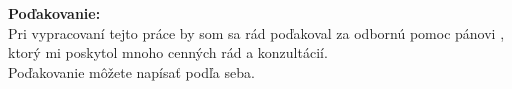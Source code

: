 \begin{flushleft}
    \textbf{Poďakovanie:}\\
    \vspace{1em}
Pri vypracovaní tejto práce by som sa rád poďakoval za odbornú pomoc pánovi \supervisor, ktorý mi poskytol mnoho cenných rád a konzultácií.
\vspace{1em}\\
Poďakovanie môžete napísať podľa seba. 
\end{flushleft}

